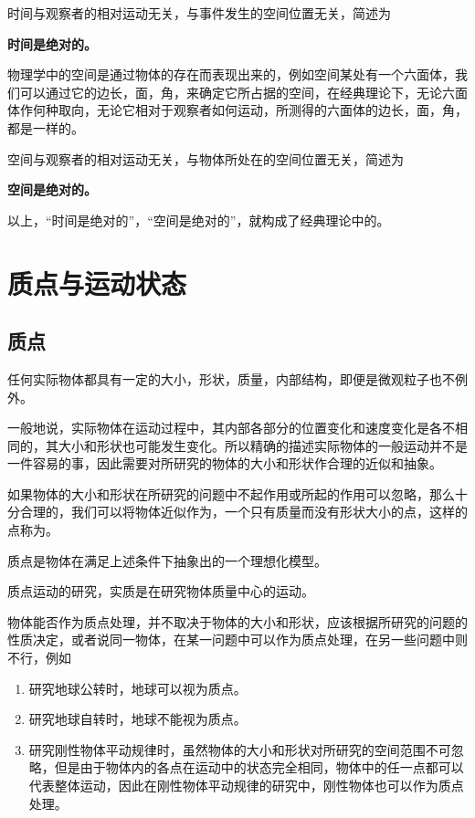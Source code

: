 时间与观察者的相对运动无关，与事件发生的空间位置无关，简述为
\begin{center}
    \textbf{时间是绝对的。}
\end{center}

物理学中的空间是通过物体的存在而表现出来的，例如空间某处有一个六面体，我们可以通过它的边长，面，角，来确定它所占据的空间，在经典理论下，无论六面体作何种取向，无论它相对于观察者如何运动，所测得的六面体的边长，面，角，都是一样的。

空间与观察者的相对运动无关，与物体所处在的空间位置无关，简述为
\begin{center}
    \textbf{空间是绝对的。}
\end{center}
以上，“时间是绝对的”，“空间是绝对的”，就构成了经典理论中的。

\section{质点与运动状态}

\subsection{质点}
任何实际物体都具有一定的大小，形状，质量，内部结构，即便是微观粒子也不例外。

一般地说，实际物体在运动过程中，其内部各部分的位置变化和速度变化是各不相同的，其大小和形状也可能发生变化。所以精确的描述实际物体的一般运动并不是一件容易的事，因此需要对所研究的物体的大小和形状作合理的近似和抽象。

如果物体的大小和形状在所研究的问题中不起作用或所起的作用可以忽略，那么十分合理的，我们可以将物体近似作为，一个只有质量而没有形状大小的点，这样的点称为。

质点是物体在满足上述条件下抽象出的一个理想化模型。

质点运动的研究，实质是在研究物体质量中心的运动。

物体能否作为质点处理，并不取决于物体的大小和形状，应该根据所研究的问题的性质决定，或者说同一物体，在某一问题中可以作为质点处理，在另一些问题中则不行，例如
\begin{enumerate}
    \item 研究地球公转时，地球可以视为质点。
    \item 研究地球自转时，地球不能视为质点。
    \item 研究刚性物体平动规律时，虽然物体的大小和形状对所研究的空间范围不可忽略，但是由于物体内的各点在运动中的状态完全相同，物体中的任一点都可以代表整体运动，因此在刚性物体平动规律的研究中，刚性物体也可以作为质点处理。
\end{enumerate}

